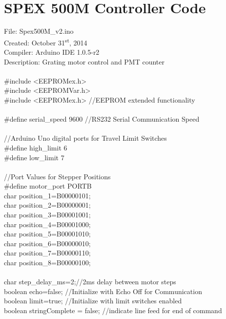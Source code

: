 {\newpage
\section{SPEX 500M Controller Code} \label{sec:SpexCode}
\selectfont
\hspace*{-\parindent}
File: Spex500M\_v2.ino\\
Created: October 31\textsuperscript{st}, 2014\\
Compiler: Arduino IDE 1.0.5\--r2\\
Description: Grating motor control and PMT counter\\
\\
\#include <EEPROMex.h>\\
\#include <EEPROMVar.h>\\
\#include <EEPROMex.h>\tabto*{7.5cm}  //EEPROM extended functionality\\  
\\
\#define serial\_speed 9600 \tabto*{7.5cm}//RS232 Serial Communication Speed\\
\\
//Arduino Uno digital ports for Travel Limit Switches\\
\#define high\_limit 6 \\ 
\#define low\_limit 7  \\
\\
//Port Values for Stepper Positions\\
\#define motor\_port PORTB \\
char position\_1=B00000101;\\
char position\_2=B00000001;\\
char position\_3=B00001001;\\
char position\_4=B00001000;\\
char position\_5=B00001010;\\
char position\_6=B00000010;\\
char position\_7=B00000110;\\
char position\_8=B00000100;\\
\\
char step\_delay\_ms=2;\tabto*{7.5cm}//2ms delay between motor steps\\
boolean echo=false;\tabto*{7.5cm}  //Initialize with Echo Off for Communication\\
boolean limit=true;\tabto*{7.5cm}  //Initialize with limit switches enabled\\
boolean stringComplete = false;\tabto*{7.5cm}  //indicate line feed for end of command\\
}
